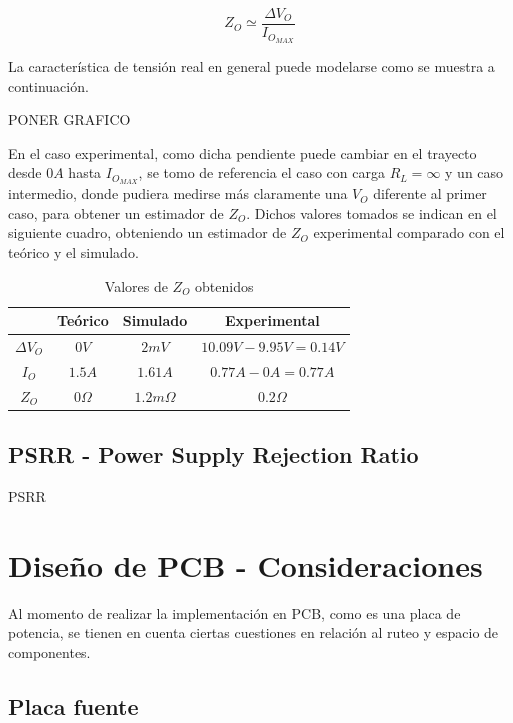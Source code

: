 $$Z_O \simeq \frac{\Delta V_O}{I_{O_{MAX}}}$$   

La caracter\'istica de tensi\'on real en general puede modelarse como se muestra a continuaci\'on.

PONER GRAFICO

En el caso experimental, como dicha pendiente puede cambiar en el trayecto desde $0A$ hasta $I_{O_{MAX}}$, se tomo de referencia el caso con carga $R_L = \infty$ y un caso intermedio, donde pudiera medirse m\'as claramente una $V_O$ diferente al primer caso, para obtener un estimador de $Z_O$. Dichos valores tomados se indican en el siguiente cuadro, obteniendo un estimador de $Z_O$ experimental comparado con el te\'orico y el simulado.


\begin{table}[!h]

\begin{center}
\begin{tabular}{|c||c|c|c|}
\hline
& Te\'orico & Simulado & Experimental\\
\hline 
$\Delta V_O$ & $0V$ & $2mV$ & $10.09V-9.95V=0.14V$\\
\hline 
$I_O$ &  $1.5A$    &   $1.61A$     & $0.77A - 0A = 0.77A$\\
\hline
$Z_O$ &   $0\Omega$   &    $1.2m\Omega$    & $0.2\Omega$\\
\hline
\end{tabular}
\end{center}

\caption{Valores de $Z_O$ obtenidos}
\end{table}


\subsection{PSRR - Power Supply Rejection Ratio}
PSRR\\

\newpage

\section{Dise\~no de PCB - Consideraciones}

Al momento de realizar la implementaci\'on en PCB, como es una placa de potencia, se tienen en cuenta ciertas cuestiones en relaci\'on al ruteo y espacio de componentes.

\subsection{Placa fuente}

